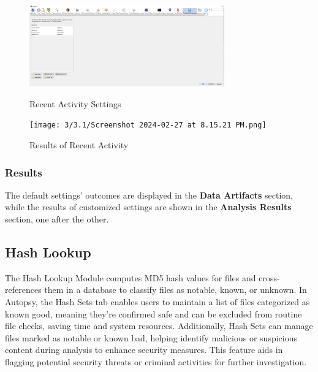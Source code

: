 \documentclass{extarticle}
\begin{document}
\begin{figure}[h]
\centering
\begin{minipage}{0.5\textwidth}
  \centering
  \begin{center}
    \includegraphics[width=0.75\textwidth]{3/3.1/recent activity settings.PNG}
\end{center}
  \caption{Recent Activity Settings}
\end{minipage}
\hfill
\begin{minipage}{0.45\textwidth}
  \centering
  \begin{center}
    \texttt{[image: 3/3.1/Screenshot 2024-02-27 at 8.15.21 PM.png]}
    \caption{Results of Recent Activity}
\end{center}
\end{minipage}
\end{figure}

\subsubsection*{Results}
The default settings' outcomes are displayed in the \textbf{Data Artifacts} section, while the results of customized settings are shown in the \textbf{Analysis Results } section, one after the other.

\subsection{Hash Lookup}
The Hash Lookup Module computes MD5 hash values for files and cross-references them in a database to classify files as notable, known, or unknown. In Autopsy, the Hash Sets tab enables users to maintain a list of files categorized as known good, meaning they're confirmed safe and can be excluded from routine file checks, saving time and system resources. Additionally, Hash Sets can manage files marked as notable or known bad, helping identify malicious or suspicious content during analysis to enhance security measures. This feature aids in flagging potential security threats or criminal activities for further investigation.
\end{document}
